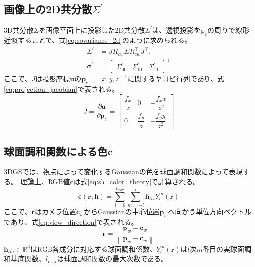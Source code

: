\documentclass[dvipdfmx]{jlreq}
\begin{document}
\subsection{画像上の2D共分散$\Sigma^{\prime}$}
3D共分散$\Sigma$を画像平面上に投影した2D共分散$\Sigma^{\prime}$は、透視投影を$\bm{p}_c$の周りで線形近似することで、式\eqref{eq:covariance_2d}のように求められる。
\begin{equation}
    \begin{aligned}
        \Sigma^{\prime} &= J R_{cw}\Sigma R_{cw}^{\top}J^{\top}, \\
        \bm{\sigma}^{\prime}
        &= \begin{bmatrix}
            \Sigma^{\prime}_{00} &
            \Sigma^{\prime}_{01} &
            \Sigma^{\prime}_{11}
        \end{bmatrix}^{\top}
    \end{aligned}
    \label{eq:covariance_2d}
\end{equation}
ここで、$J$は投影座標$\bm{u}$の$\bm{p}_c=[x,y,z]^{\top}$に関するヤコビ行列であり、式\eqref{eq:projection_jacobian}で表される。
\begin{equation}
    J
    = \frac{\partial\bm{u}}{\partial\bm{p}_c}
    = \begin{bmatrix}
        \dfrac{f_x}{z} & 0 & -\dfrac{f_x x}{z^2} \\[1.5ex]
        0 & \dfrac{f_y}{z} & -\dfrac{f_y y}{z^2}
    \end{bmatrix}
    \label{eq:projection_jacobian}
\end{equation}

\subsection{球面調和関数による色$\bm{c}$}
3DGSでは、視点によって変化するGaussianの色を球面調和関数によって表現する。
理論上、RGB値$\bm{c}$は式\eqref{eq:sh_color_theory}で計算される。\footnotemark
\begin{equation}
    \bm{c}(\bm{r},\bm{h})
    = \sum_{l=0}^{l_{\max}} \sum_{m=-l}^{l}
    \bm{h}_{lm}Y_l^m(\bm{r})
    \label{eq:sh_color_theory}
\end{equation}
ここで、$\bm{r}$はカメラ位置$\bm{c}_w$からGaussianの中心位置$\bm{p}_w$へ向かう単位方向ベクトルであり、式\eqref{eq:view_direction}で表される。
\begin{equation}
    \bm{r} = \frac{\bm{p}_w-\bm{c}_w} {\left\lVert\bm{p}_w-\bm{c}_w\right\rVert}
    \label{eq:view_direction}
\end{equation}
$\bm{h}_{lm}\in\mathbb{R}^3$はRGB各成分に対応する球面調和係数、$Y_l^m(\bm{r})$は$l$次$m$番目の実球面調和基底関数、$l_{\max}$は球面調和関数の最大次数である。
\end{document}
